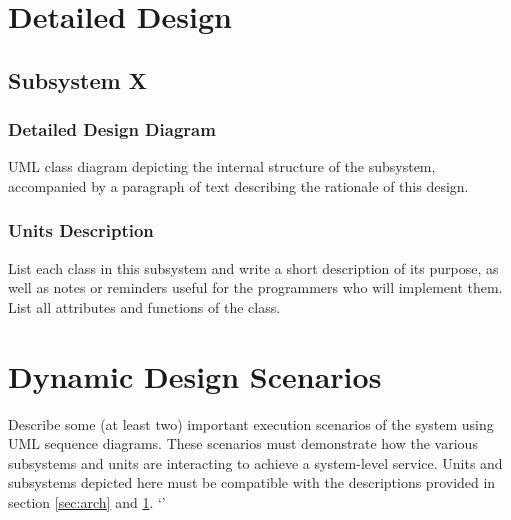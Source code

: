 \documentclass[12pt]{article}
\begin{document}
\section{Detailed Design} \label{sec:detail}

\subsection{Subsystem X}

\subsubsection{Detailed Design Diagram}

UML class diagram depicting the internal structure of the subsystem,
accompanied by a paragraph of text describing the rationale of this design.

\subsubsection{Units Description}

List each class in this subsystem and write a short description of its purpose,
as well as notes or reminders useful for the programmers who will implement them.
List all attributes and functions of the class.


\section{Dynamic Design Scenarios}

Describe some (at least two) important execution scenarios of the system using UML sequence diagrams.
These scenarios must demonstrate how the various subsystems and units are interacting to achieve a system-level service.
Units and subsystems depicted here must be compatible with the descriptions provided in
section \ref{sec:arch} and \ref{sec:detail}.
`'
\end{document}
